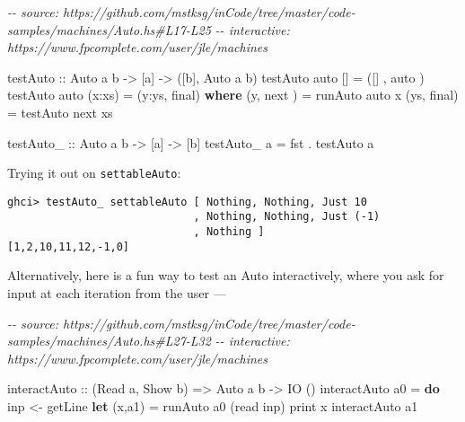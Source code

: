 \documentclass[]{article}
\newenvironment{Shaded}{}{}
\newcommand{\CommentTok}[1]{\textcolor[rgb]{0.38,0.63,0.69}{\textit{#1}}}
\newcommand{\DataTypeTok}[1]{\textcolor[rgb]{0.56,0.13,0.00}{#1}}
\newcommand{\FunctionTok}[1]{\textcolor[rgb]{0.02,0.16,0.49}{#1}}
\newcommand{\KeywordTok}[1]{\textcolor[rgb]{0.00,0.44,0.13}{\textbf{#1}}}
\newcommand{\NormalTok}[1]{#1}
\newcommand{\OperatorTok}[1]{\textcolor[rgb]{0.40,0.40,0.40}{#1}}
\newcommand{\OtherTok}[1]{\textcolor[rgb]{0.00,0.44,0.13}{#1}}
\begin{document}
\begin{Shaded}
\begin{Highlighting}[]
\CommentTok{{-}{-} source: https://github.com/mstksg/inCode/tree/master/code{-}samples/machines/Auto.hs\#L17{-}L25}
\CommentTok{{-}{-} interactive: https://www.fpcomplete.com/user/jle/machines}

\OtherTok{testAuto ::} \DataTypeTok{Auto}\NormalTok{ a b }\OtherTok{{-}\textgreater{}}\NormalTok{ [a] }\OtherTok{{-}\textgreater{}}\NormalTok{ ([b], }\DataTypeTok{Auto}\NormalTok{ a b)}
\NormalTok{testAuto auto []      }\OtherTok{=}\NormalTok{ ([]  , auto )}
\NormalTok{testAuto auto (x}\OperatorTok{:}\NormalTok{xs)  }\OtherTok{=}\NormalTok{ (y}\OperatorTok{:}\NormalTok{ys, final)}
  \KeywordTok{where}
\NormalTok{    (y,  next ) }\OtherTok{=}\NormalTok{ runAuto  auto x}
\NormalTok{    (ys, final) }\OtherTok{=}\NormalTok{ testAuto next xs}

\OtherTok{testAuto\_ ::} \DataTypeTok{Auto}\NormalTok{ a b }\OtherTok{{-}\textgreater{}}\NormalTok{ [a] }\OtherTok{{-}\textgreater{}}\NormalTok{ [b]}
\NormalTok{testAuto\_ a }\OtherTok{=} \FunctionTok{fst} \OperatorTok{.}\NormalTok{ testAuto a}
\end{Highlighting}
\end{Shaded}

Trying it out on \texttt{settableAuto}:

\begin{verbatim}
ghci> testAuto_ settableAuto [ Nothing, Nothing, Just 10
                             , Nothing, Nothing, Just (-1)
                             , Nothing ]
[1,2,10,11,12,-1,0]
\end{verbatim}

Alternatively, here is a fun way to test an Auto interactively, where you ask
for input at each iteration from the user ---

\begin{Shaded}
\begin{Highlighting}[]
\CommentTok{{-}{-} source: https://github.com/mstksg/inCode/tree/master/code{-}samples/machines/Auto.hs\#L27{-}L32}
\CommentTok{{-}{-} interactive: https://www.fpcomplete.com/user/jle/machines}

\OtherTok{interactAuto ::}\NormalTok{ (}\DataTypeTok{Read}\NormalTok{ a, }\DataTypeTok{Show}\NormalTok{ b) }\OtherTok{=\textgreater{}} \DataTypeTok{Auto}\NormalTok{ a b }\OtherTok{{-}\textgreater{}} \DataTypeTok{IO}\NormalTok{ ()}
\NormalTok{interactAuto a0 }\OtherTok{=} \KeywordTok{do}
\NormalTok{    inp }\OtherTok{\textless{}{-}} \FunctionTok{getLine}
    \KeywordTok{let}\NormalTok{ (x,a1) }\OtherTok{=}\NormalTok{ runAuto a0 (}\FunctionTok{read}\NormalTok{ inp)}
    \FunctionTok{print}\NormalTok{ x}
\NormalTok{    interactAuto a1}
\end{Highlighting}
\end{Shaded}
\end{document}
